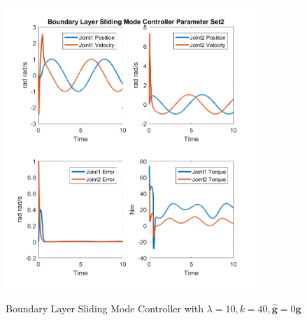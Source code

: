 \begin{figure}[]
	\centering
	\includegraphics[width=0.85\textwidth]{pics/BoundaryLayerSlidingModeControllerParameterSet2.png}\\
	\caption{Boundary Layer Sliding Mode Controller with $\lambda = 10, k=40,\hat{\mathbf{g}}=0\mathbf{g}$  }
	\label{fig:ch5_smo7}
\end{figure}
